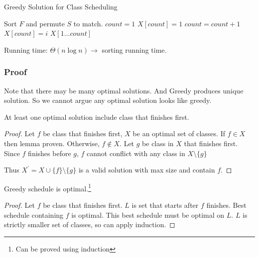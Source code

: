 \begin{algorithm}[H]
    \caption{Greedy Solution for Class Scheduling}\label{greedy_class_scheduling}
    \begin{algorithmic}[1]
            \State Sort $F$ and permute $S$ to match.
            \State $count = 1$
            \State $X[count] = 1$ 
                    \State $count = count + 1$
                    \State $X[count] = i$
                \EndIf
            \EndFor
            \Return $X[1 \ldots count]$
        \EndProcedure
    \end{algorithmic}
\end{algorithm}

Running time: $\Theta(n \log n) \rightarrow $ sorting running time.

\subsubsection{Proof}
Note that there may be many optimal solutions.
And Greedy produces unique solution.
So we cannot argue any optimal solution looks like greedy.

\begin{lemma}
At least one optimal solution include class that finishes first.
\end{lemma}

\begin{proof}
    Let $f$ be class that finishes first, $X$ be an optimal set of classes.
    If $f \in X$ then lemma proven.
    Otherwise, $f \notin X$. Let $g$ be class in $X$ that finishes first.
    Since $f$ finishes before $g$, $f$ cannot conflict with any class in $X \setminus \{g\}$

    Thus $X^\prime = X \cup \{f\} \setminus \{g\}$ is a valid solution with max size and contain $f$.
\end{proof}

\begin{theorem}
    Greedy schedule is optimal.\footnote{Can be proved using induction}
\end{theorem}

\begin{proof}
    Let $f$ be class that finishes first. $L$ is set that starts after $f$ finishes.
    Best schedule containing $f$ is optimal. This best schedule must be optimal on $L$.
    $L$ is strictly smaller set of classes, so can apply induction.
\end{proof}

